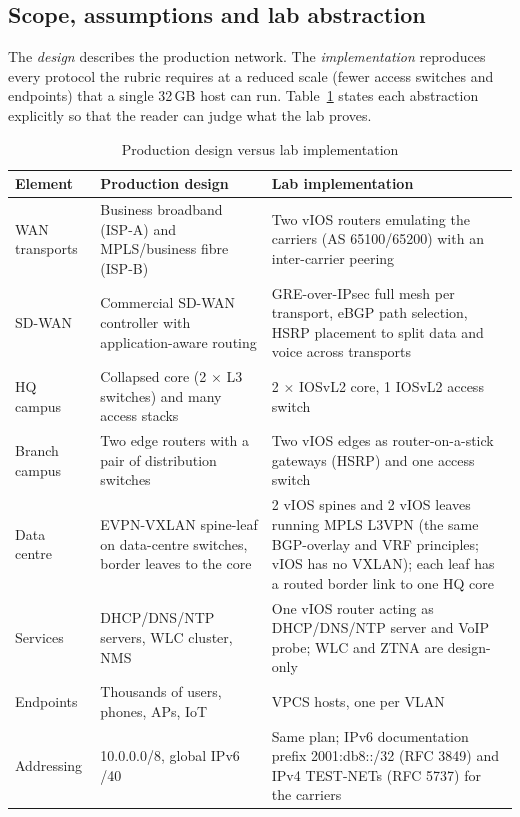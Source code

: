 \documentclass[11pt,a4paper]{article}
\begin{document}
\subsection{Scope, assumptions and lab abstraction}

The \emph{design} describes the production network. The \emph{implementation} reproduces every protocol the rubric requires at a reduced scale (fewer access switches and endpoints) that a single 32\,GB host can run. Table~\ref{tab:abstraction} states each abstraction explicitly so that the reader can judge what the lab proves.

\begin{table}[H]
\centering\small
\caption{Production design versus lab implementation}
\label{tab:abstraction}
\begin{tabularx}{\linewidth}{@{}p{3.2cm}XX@{}}
\toprule
\textbf{Element} & \textbf{Production design} & \textbf{Lab implementation}\\
\midrule
WAN transports & Business broadband (ISP-A) and MPLS/business fibre (ISP-B) & Two vIOS routers emulating the carriers (AS 65100/65200) with an inter-carrier peering\\
SD-WAN & Commercial SD-WAN controller with application-aware routing & GRE-over-IPsec full mesh per transport, eBGP path selection, HSRP placement to split data and voice across transports\\
HQ campus & Collapsed core (2 $\times$ L3 switches) and many access stacks & 2 $\times$ IOSvL2 core, 1 IOSvL2 access switch\\
Branch campus & Two edge routers with a pair of distribution switches & Two vIOS edges as router-on-a-stick gateways (HSRP) and one access switch\\
Data centre & EVPN-VXLAN spine-leaf on data-centre switches, border leaves to the core & 2 vIOS spines and 2 vIOS leaves running MPLS L3VPN (the same BGP-overlay and VRF principles; vIOS has no VXLAN); each leaf has a routed border link to one HQ core\\
Services & DHCP/DNS/NTP servers, WLC cluster, NMS & One vIOS router acting as DHCP/DNS/NTP server and VoIP probe; WLC and ZTNA are design-only\\
Endpoints & Thousands of users, phones, APs, IoT & VPCS hosts, one per VLAN\\
Addressing & 10.0.0.0/8, global IPv6 /40 & Same plan; IPv6 documentation prefix 2001:db8::/32 (RFC 3849) and IPv4 TEST-NETs (RFC 5737) for the carriers\\
\bottomrule
\end{tabularx}
\end{table}
\end{document}
